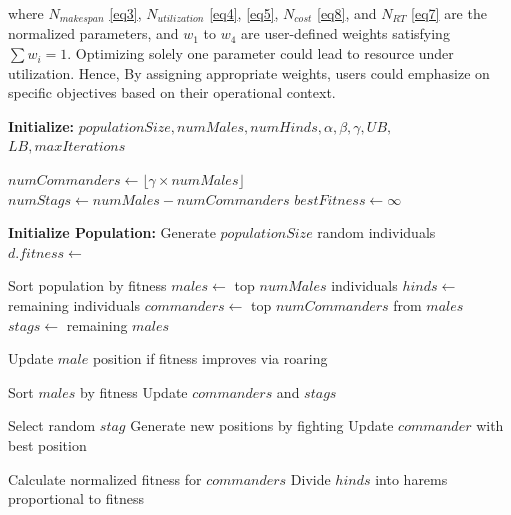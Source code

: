 \documentclass[pdflatex,sn-mathphys-num]{sn-jnl}%
\theoremstyle{thmstyleone}%
\theoremstyle{thmstyletwo}%
\theoremstyle{thmstylethree}%
\begin{document}
where $N_{makespan}$ \ref{eq3}, $N_{utilization}$ \ref{eq4}, \ref{eq5}, $N_{cost}$ \ref{eq8}, and $ N_{RT}$ \ref{eq7} are the normalized parameters, and $w_1$ to $w_4$ are user-defined weights satisfying $\sum w_i = 1$. Optimizing solely one parameter could lead to resource under utilization. Hence, By assigning appropriate weights, users could emphasize on specific objectives based on their operational context.



\begin{algorithm}
\caption{RDA for Load Balancing in Cloud Computing}\label{alg:rda_load_balancing}
\begin{algorithmic}[1]
    \State \textbf{Initialize:} $populationSize, numMales, numHinds, \alpha, \beta, \gamma, UB,$
    \State \hspace{10em} $LB, maxIterations$

    \State $numCommanders \gets \lfloor \gamma \times numMales \rfloor$
    \State $numStags \gets numMales - numCommanders$
    \State $bestFitness \gets \infty$

    \State \textbf{Initialize Population:} Generate $populationSize$ random individuals
        \State $d.fitness \gets$ 
    \EndFor

    \State Sort population by fitness
    \State $males \gets$ top $numMales$ individuals
    \State $hinds \gets$ remaining individuals
    \State $commanders \gets$ top $numCommanders$ from $males$
    \State $stags \gets$ remaining $males$

            \State Update $male$ position if fitness improves via roaring
        \EndFor

        \State Sort $males$ by fitness
        \State Update $commanders$ and $stags$

            \State Select random $stag$
            \State Generate new positions by fighting
            \State Update $commander$ with best position
        \EndFor

        \State Calculate normalized fitness for $commanders$
        \State Divide $hinds$ into harems proportional to fitness


\end{algorithmic}
\end{algorithm}
\end{document}
